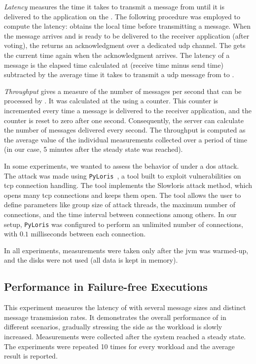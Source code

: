 \emph{Latency} measures the time it takes to transmit a message from \sender until it is delivered to the application on the \postsieve. 
The following procedure was employed to compute the latency: \sender obtains the local time before transmitting a message. 
When the message arrives and is ready to be delivered to the receiver application (after voting), the \postsieve returns an acknowledgment over a dedicated \gls{udp} channel.
The \Sender gets the current time again when the acknowledgment arrives. 
The latency of a message is the elapsed time calculated at \sender (receive time minus send time) subtracted by the average time it takes to transmit a \gls{udp} message from \postsieve to \sender.

\emph{Throughput} gives a measure of the number of messages per second that can be processed by \sieveq. 
It was calculated at the \postsieve using a counter. 
This counter is incremented every time a message is delivered to the receiver application, and the counter is reset to zero after one second. 
Consequently, the server can calculate the number of messages delivered every second. 
The throughput is computed as the average value of the individual measurements collected over a period of time (in our case, 5 minutes after the steady state was reached).

In some experiments, we wanted to assess the behavior of \sieveq under a \gls{dos} attack. 
The attack was made using \texttt{PyLoris}~\cite{pyloris}, a tool built to exploit vulnerabilities on \gls{tcp} connection handling.
The tool implements the Slowloris attack method, which opens many \gls{tcp} connections and keeps them open.
The tool allows the user to define parameters like group size of attack threads, the maximum number of connections, and the time interval between connections among others.
In our setup, \texttt{PyLoris} was configured to perform an unlimited number of connections, with $0.1$ milliseconds between each connection.

In all experiments, measurements were taken only after the \gls{jvm} was warmed-up, and the disks were not used (all data is kept in memory).


\subsection{Performance in Failure-free Executions}
\label{throughput_latency}

This experiment measures the latency of \sieveq with several message sizes and distinct message transmission rates. 
It demonstrates the overall performance of \sieveq in different scenarios, gradually stressing the \postsieve side as the workload is slowly increased. 
Measurements were collected after the system reached a steady state. 
The experiments were repeated 10 times for every workload and the average result is reported.

